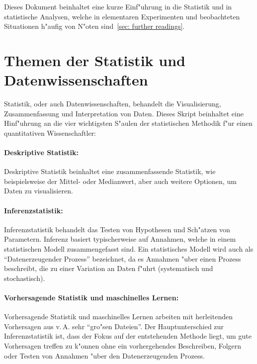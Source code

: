 \documentclass[a4paper,twoside]{tufte-book}\usepackage[]{graphicx}\usepackage[]{color}
\begin{document}
Dieses Dokument beinhaltet eine kurze Einf"uhrung in die Statistik und in statistische Analysen, welche in elementaren Experimenten und beobachteten Situationen h"aufig von N"oten sind~\ref{sec: further readings}.

\section{Themen der Statistik und Datenwissenschaften}
Statistik, oder auch Datenwissenschaften, behandelt die Visualisierung, Zusammenfassung und Interpretation von Daten. Dieses Skript beinhaltet eine Hinf"uhrung an die vier wichtigsten S"aulen der statistischen Methodik f"ur einen quantitativen Wissenschaftler:

\paragraph{Deskriptive Statistik:} Deskriptive Statistik beinhaltet eine zusammenfassende Statistik, wie beispielsweise der Mittel- oder Medianwert, aber auch weitere Optionen, um Daten zu visualisieren.

\paragraph{Inferenzstatistik:} Inferenzstatistik behandelt das Testen von Hypothesen und Sch"atzen von Parametern. Inferenz basiert typischerweise auf Annahmen, welche in einem statistischen Modell zusammengefasst sind. Ein statistisches Modell wird auch als "`Datenerzeugender Prozess"' bezeichnet, da es Annahmen "uber einen Prozess beschreibt, die zu einer Variation an Daten f"uhrt (systematisch und stochastisch).

\paragraph{Vorhersagende Statistik und maschinelles Lernen:} Vorhersagende Statistik und maschinelles Lernen arbeiten mit herleitenden Vorhersagen aus v.\,A. sehr "`gro"sen Dateien"'. Der Hauptunterschied zur Inferenzstatistik ist, dass der Fokus auf der entstehenden Methode liegt, um gute Vorhersagen treffen zu k"onnen ohne ein vorhergehendes Beschreiben, Folgern oder Testen von Annahmen "uber den Datenerzeugenden Prozess.
\end{document}
